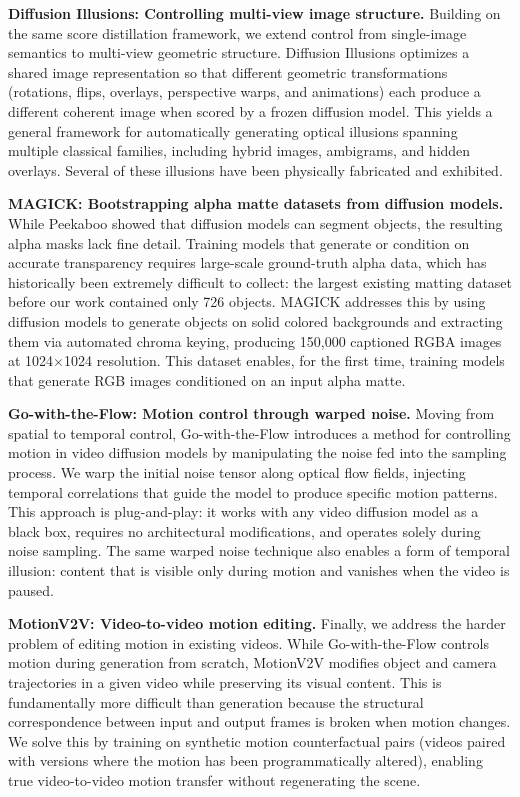 \textbf{Diffusion Illusions: Controlling multi-view image structure.}
Building on the same score distillation framework, we extend control from single-image semantics to multi-view geometric structure. Diffusion Illusions optimizes a shared image representation so that different geometric transformations (rotations, flips, overlays, perspective warps, and animations) each produce a different coherent image when scored by a frozen diffusion model. This yields a general framework for automatically generating optical illusions spanning multiple classical families, including hybrid images, ambigrams, and hidden overlays. Several of these illusions have been physically fabricated and exhibited.

\textbf{MAGICK: Bootstrapping alpha matte datasets from diffusion models.}
While Peekaboo showed that diffusion models can segment objects, the resulting alpha masks lack fine detail. Training models that generate or condition on accurate transparency requires large-scale ground-truth alpha data, which has historically been extremely difficult to collect: the largest existing matting dataset before our work contained only 726 objects. MAGICK addresses this by using diffusion models to generate objects on solid colored backgrounds and extracting them via automated chroma keying, producing 150,000 captioned RGBA images at 1024$\times$1024 resolution. This dataset enables, for the first time, training models that generate RGB images conditioned on an input alpha matte.

\textbf{Go-with-the-Flow: Motion control through warped noise.}
Moving from spatial to temporal control, Go-with-the-Flow introduces a method for controlling motion in video diffusion models by manipulating the noise fed into the sampling process. We warp the initial noise tensor along optical flow fields, injecting temporal correlations that guide the model to produce specific motion patterns. This approach is plug-and-play: it works with any video diffusion model as a black box, requires no architectural modifications, and operates solely during noise sampling. The same warped noise technique also enables a form of temporal illusion: content that is visible only during motion and vanishes when the video is paused.

\textbf{MotionV2V: Video-to-video motion editing.}
Finally, we address the harder problem of editing motion in existing videos. While Go-with-the-Flow controls motion during generation from scratch, MotionV2V modifies object and camera trajectories in a given video while preserving its visual content. This is fundamentally more difficult than generation because the structural correspondence between input and output frames is broken when motion changes. We solve this by training on synthetic motion counterfactual pairs (videos paired with versions where the motion has been programmatically altered), enabling true video-to-video motion transfer without regenerating the scene.

